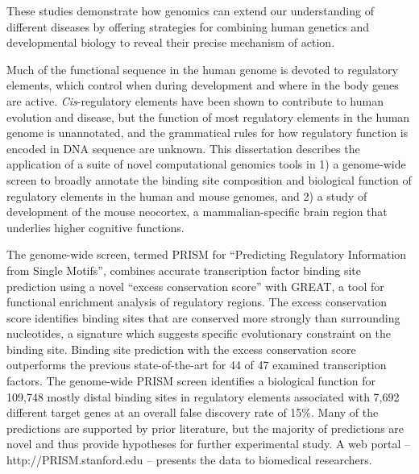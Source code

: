 These studies demonstrate how genomics can extend our understanding of different diseases by offering strategies for combining human genetics and developmental biology to reveal their precise mechanism of action.

Much of the functional sequence in the human genome is devoted to regulatory elements, which control when during development and where in the body genes are active.  \textit{Cis}-regulatory elements have been shown to contribute to human evolution and disease, but the function of most regulatory elements in the human genome is unannotated, and the grammatical rules for how regulatory function is encoded in DNA sequence are unknown.  This dissertation describes the application of a suite of novel computational genomics tools in 1) a genome-wide screen to broadly annotate the binding site composition and biological function of regulatory elements in the human and mouse genomes, and 2) a study of development of the mouse neocortex, a mammalian-specific brain region that underlies higher cognitive functions.
%

The genome-wide screen, termed PRISM for ``Predicting Regulatory Information from Single Motifs'', combines accurate transcription factor binding site prediction using a novel ``excess conservation score'' with GREAT, a tool for functional enrichment analysis of regulatory regions.  The
excess conservation score identifies binding sites that are conserved more
strongly than surrounding nucleotides, a signature which suggests specific
evolutionary constraint on the binding site.  Binding site prediction with
the excess conservation score outperforms the previous state-of-the-art for
44 of 47 examined transcription factors.  The genome-wide PRISM screen identifies a biological function
for 109,748 mostly distal binding sites in regulatory elements associated with 7,692
different target genes at an overall false discovery rate of 15\%.  Many of
the predictions are supported by prior literature, but the majority of predictions
are novel and thus provide hypotheses for further experimental study.  A web
portal -- http://PRISM.stanford.edu -- presents the data to biomedical researchers.
%

